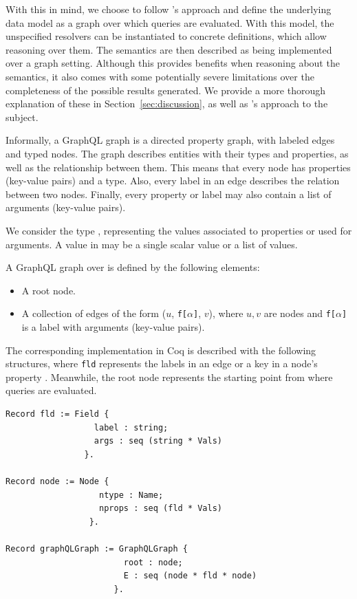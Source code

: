 With this in mind, we choose to follow \HP{}'s approach and define the underlying data model as a graph over which queries are evaluated. With this model, the unspecified resolvers can be instantiated to concrete definitions, which allow reasoning over them. The semantics are then described as being implemented over a graph setting. Although this provides benefits when reasoning about the semantics, it also comes with some potentially severe limitations over the completeness of the possible results generated. We provide a more thorough explanation of these in Section~\ref{sec:discussion}, as well as \HP{}'s approach to the subject.

Informally, a GraphQL graph is a directed property graph, with labeled edges and typed nodes. The graph describes entities with their types and properties, as well as the relationship between them. This means that every node has properties (key-value pairs) and a type. Also, every label in an edge describes the relation between two nodes. Finally, every property or label may also contain a list of arguments (key-value pairs).

We consider the type \Vals, representing the values associated to properties or used for arguments. A value in \Vals{} may be a single scalar value or a list of values.

\begin{definition}
A GraphQL graph over \Vals{} is defined by the following elements:
\begin{itemize}
    \item A root node.
    \item A collection of edges of the form ($u$, \texttt{f[}$\alpha$\texttt{]}, $v$), where $u, v$ are nodes and \texttt{f[}$\alpha$\texttt{]} is a label with arguments (key-value pairs).
\end{itemize}
\end{definition}

The corresponding implementation in Coq is described with the following structures, where \texttt{fld} represents the labels in an edge or a key in a node's property . 
Meanwhile, the root node represents the starting point from where queries are evaluated.

\begin{verbatim}
Record fld := Field {
                  label : string;
                  args : seq (string * Vals)
                }.

Record node := Node {
                   ntype : Name;
                   nprops : seq (fld * Vals)
                 }.

Record graphQLGraph := GraphQLGraph {
                        root : node;
                        E : seq (node * fld * node)
                      }.
\end{verbatim}

